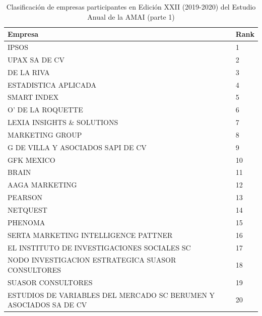 \begin{table}[]
\caption{Clasificación de empresas participantes en Edición XXII (2019-2020) del Estudio Anual de la AMAI (parte 1)}
\label{tab:clasificación1}
\begin{tabular}{|l|l|}
\hline
Empresa                                                            & Rank \\ \hline
IPSOS                                                              & 1    \\ \hline
UPAX SA DE CV                                                      & 2    \\ \hline
DE LA RIVA                                                         & 3    \\ \hline
ESTADISTICA APLICADA                                               & 4    \\ \hline
SMART INDEX                                                        & 5    \\ \hline
O’ DE LA ROQUETTE                                                  & 6    \\ \hline
LEXIA INSIGHTS \& SOLUTIONS                                        & 7    \\ \hline
MARKETING GROUP                                                    & 8    \\ \hline
G DE VILLA Y ASOCIADOS SAPI DE CV                                  & 9    \\ \hline
GFK MEXICO                                                         & 10   \\ \hline
BRAIN                                                              & 11   \\ \hline
AAGA MARKETING                                                     & 12   \\ \hline
PEARSON                                                            & 13   \\ \hline
NETQUEST                                                           & 14   \\ \hline
PHENOMA                                                            & 15   \\ \hline
SERTA MARKETING INTELLIGENCE PATTNER                               & 16   \\ \hline
EL INSTITUTO DE INVESTIGACIONES SOCIALES SC                        & 17   \\ \hline
\parbox[t]{11cm}{NODO INVESTIGACION ESTRATEGICA SUASOR CONSULTORES \vspace{0.1cm} }                   & 18   \\ \hline
SUASOR CONSULTORES                                                 & 19   \\ \hline
\parbox[t]{11cm}{ESTUDIOS DE VARIABLES DEL MERCADO SC BERUMEN Y ASOCIADOS SA DE CV \vspace{0.1cm}}  & 20   \\ \hline
\end{tabular}
\end{table}


